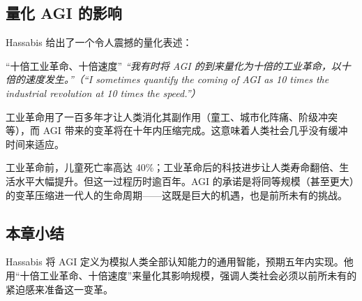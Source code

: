 \subsection{量化 AGI 的影响}

Hassabis 给出了一个令人震撼的量化表述：

\begin{importantbox}{``十倍工业革命、十倍速度''}
\textit{``我有时将 AGI 的到来量化为十倍的工业革命，以十倍的速度发生。''（``I sometimes quantify the coming of AGI as 10 times the industrial revolution at 10 times the speed.''）}

工业革命用了一百多年才让人类消化其副作用（童工、城市化阵痛、阶级冲突等），而 AGI 带来的变革将在十年内压缩完成。这意味着人类社会几乎没有缓冲时间来适应。
\end{importantbox}

工业革命前，儿童死亡率高达 40\%；工业革命后的科技进步让人类寿命翻倍、生活水平大幅提升。但这一过程历时逾百年。AGI 的承诺是将同等规模（甚至更大）的变革压缩进一代人的生命周期——这既是巨大的机遇，也是前所未有的挑战。

\subsection{本章小结}

Hassabis 将 AGI 定义为模拟人类全部认知能力的通用智能，预期五年内实现。他用``十倍工业革命、十倍速度''来量化其影响规模，强调人类社会必须以前所未有的紧迫感来准备这一变革。

